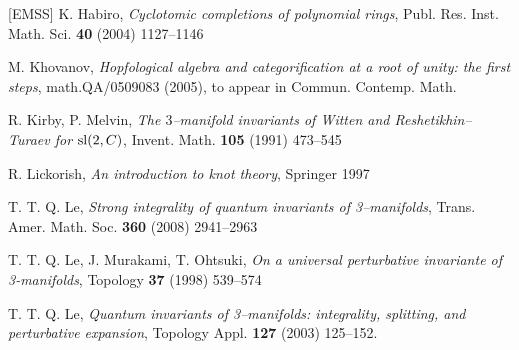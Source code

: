 \documentclass[12pt]{amsart}
\theoremstyle{plain}
\theoremstyle{definition}
\begin{document}
\begin{thebibliography}{[EMSS]}
 K. Habiro, {\em Cyclotomic completions of polynomial rings},
Publ. Res. Inst. Math. Sci.  {\bf 40}  (2004)   1127--1146






 M. Khovanov, {\em Hopfological algebra and categorification
at a root of unity: the first steps}, math.QA/0509083 (2005), to appear in
Commun.  Contemp. Math.



 R. Kirby, P. Melvin, {\em The $3$--manifold invariants of Witten and Reshetikhin--Turaev for ${\rm sl}(2,C)$},
Invent. Math. {\bf 105} (1991)  473--545


 R. Lickorish, {\em An introduction to knot theory}, Springer 1997


 T. T. Q. Le, {\em Strong integrality of quantum
    invariants of 3--manifolds}, Trans. Amer. Math. Soc. {\bf 360} (2008)
 2941--2963






 T. T. Q. Le, J. Murakami, T. Ohtsuki,
{\em On a universal perturbative
invariante of 3-manifolds}, Topology {\bf 37} (1998) 539--574

 T. T. Q. Le,   {\em Quantum invariants of 3--manifolds:
integrality,
splitting, and perturbative expansion},  Topology Appl.  {\bf 127}
(2003)  125--152.


\end{thebibliography}
\end{document}
